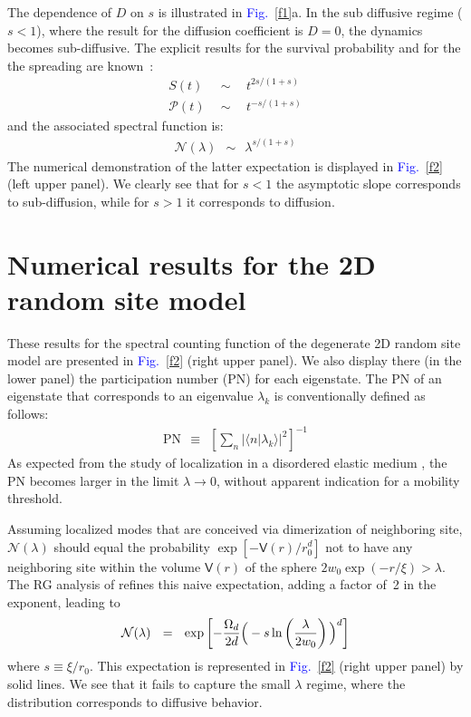 \documentclass[onecolumn,fleqn,12pt,openany,draft]{book}
\newcommand{\mylabel}[1]{\label{#1}}
\newcommand{\beq}{\begin{eqnarray}}
\newcommand{\eeq}{\end{eqnarray}}
\newcommand{\be}[1]{\begin{eqnarray}\ifthenelse{#1=-1}
{\nonumber}{\ifthenelse{#1=0}{}{\mylabel{e#1}}}}
\newcommand{\Fig}[1]{\textcolor{blue}{Fig.}\!\!~\ref{#1}}
\begin{document}
The dependence of $D$ on $s$ is illustrated in \Fig{f1}a.
In the sub diffusive regime (${s<1}$),  
where the result for the diffusion coefficient is ${D=0}$, 
the dynamics becomes sub-diffusive.  
The explicit results for the survival probability 
and for the the spreading are known~\cite{alexander}: 
%
\beq
S(t) \ \ &\sim& \ \ t^{2s/(1+s)}   \\ 
\mathcal{P}(t) \ \ &\sim& \ \ t^{-s/(1+s)}
\eeq
%
and the associated spectral function is:
%
\beq
\mathcal{N}(\lambda) \ \ \sim \ \ \lambda^{s/(1+s)}
\eeq
%
The numerical demonstration of the latter expectation is displayed 
in \Fig{f2} (left upper panel).
We clearly see that for $s<1$ the asymptotic slope corresponds 
to sub-diffusion, while for ${s>1}$ it corresponds to diffusion. 



\section{Numerical results for the 2D random site model}

These results for the spectral counting function
of the degenerate 2D random site model are presented  
in \Fig{f2} (right upper panel). 
We also display there (in the lower panel) 
the participation number (PN) for each eigenstate. 
The PN of an eigenstate that corresponds to 
an eigenvalue $\lambda_k$ is conventionally 
defined as follows:
%
\beq 
\text{PN} \ \ \equiv \ \ \left[ \sum_n |\langle n| \lambda_k \rangle|^2 \right]^{-1}
\eeq
%
As expected from the study of localization
in a disordered elastic medium \cite{loc}, 
the PN becomes larger in the limit ${\lambda\rightarrow 0}$, 
without apparent indication for a mobility threshold.


Assuming localized modes that are conceived via dimerization of 
neighboring site, $\mathcal{N}(\lambda)$ should equal 
the probability $\exp[-\mathsf{V}(r)/r_0^d]$ 
not to have any neighboring site within 
the volume $\mathsf{V}(r)$ of the sphere ${2w_0 \exp(-r/\xi) > \lambda}$. 
The RG analysis of \cite{amir} refines this naive 
expectation, adding a factor of~2 in the exponent, leading to 
%
\be{23}
\mathcal{N}(\lambda) \ \ = \ \ \exp\left[ -\frac{\Omega_d}{2d} \Big(-s \ln\left(\frac{\lambda}{2w_0}\right)\Big)^d \right]
\eeq
%
where $s \equiv \xi/r_0$. 
This expectation is represented in \Fig{f2} (right upper panel) 
by solid lines.  We see that it fails to capture the small $\lambda$ regime, 
where the distribution corresponds to diffusive behavior. 
\end{document}
